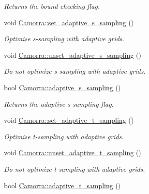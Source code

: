 \begin{DoxyCompactItemize}
\begin{DoxyCompactList}\small\item\em Returns the bound-\/checking flag. \end{DoxyCompactList}\item 
\hypertarget{a00831_aa23e6050bd813300a6cc4e68301a680b}{
void \hyperlink{a00831_aa23e6050bd813300a6cc4e68301a680b}{Camorra::set\_\-adaptive\_\-s\_\-sampling} ()}
\label{a00831_aa23e6050bd813300a6cc4e68301a680b}

\begin{DoxyCompactList}\small\item\em Optimise s-\/sampling with adaptive grids. \end{DoxyCompactList}\item 
\hypertarget{a00831_ab65c79fa174745c806ef38cbec2ee367}{
void \hyperlink{a00831_ab65c79fa174745c806ef38cbec2ee367}{Camorra::unset\_\-adaptive\_\-s\_\-sampling} ()}
\label{a00831_ab65c79fa174745c806ef38cbec2ee367}

\begin{DoxyCompactList}\small\item\em Do not optimize s-\/sampling with adaptive grids. \end{DoxyCompactList}\item 
\hypertarget{a00831_a54293db384f71be66101216d13cd5b13}{
bool \hyperlink{a00831_a54293db384f71be66101216d13cd5b13}{Camorra::adaptive\_\-s\_\-sampling} ()}
\label{a00831_a54293db384f71be66101216d13cd5b13}

\begin{DoxyCompactList}\small\item\em Returns the adaptive s-\/sampling flag. \end{DoxyCompactList}\item 
\hypertarget{a00831_aecfbb69e43431f561d3d38834e153c0b}{
void \hyperlink{a00831_aecfbb69e43431f561d3d38834e153c0b}{Camorra::set\_\-adaptive\_\-t\_\-sampling} ()}
\label{a00831_aecfbb69e43431f561d3d38834e153c0b}

\begin{DoxyCompactList}\small\item\em Optimise t-\/sampling with adaptive grids. \end{DoxyCompactList}\item 
\hypertarget{a00831_ad0d9c41614a0b23e3f413cca183b7541}{
void \hyperlink{a00831_ad0d9c41614a0b23e3f413cca183b7541}{Camorra::unset\_\-adaptive\_\-t\_\-sampling} ()}
\label{a00831_ad0d9c41614a0b23e3f413cca183b7541}

\begin{DoxyCompactList}\small\item\em Do not optimize t-\/sampling with adaptive grids. \end{DoxyCompactList}\item 
\hypertarget{a00831_a249c2403f0350fffedf4785f6348924e}{
bool \hyperlink{a00831_a249c2403f0350fffedf4785f6348924e}{Camorra::adaptive\_\-t\_\-sampling} ()}
\label{a00831_a249c2403f0350fffedf4785f6348924e}


\end{DoxyCompactItemize}
